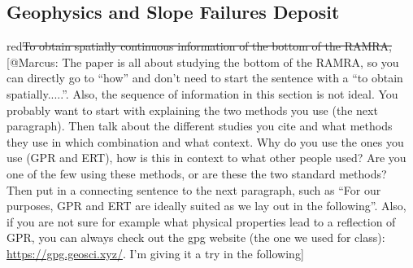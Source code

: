 \documentclass[utf8]{frontiersSCNS}
\newcommand{\alon}{\begin{color}{red}}
\newcommand{\aloff}{\end{color}}
\begin{document}



                 
                 
\subsection{Geophysics and Slope Failures Deposit}

\alon\sout{To obtain spatially continuous information of the bottom of the RAMRA,} [@Marcus: The paper is all about studying the bottom of the RAMRA, so you can directly go to ``how'' and don't need to start the sentence with a ``to obtain spatially.....''. Also, the sequence of information in this section is not ideal. You probably want to start with explaining the two methods you use (the next paragraph). Then talk about the different studies you cite and what methods they use in which combination and what context. Why do you use the ones you use (GPR and ERT), how is this in context to what other people used? Are you one of the few using these methods, or are these the two standard methods? Then put in a connecting sentence to the next paragraph, such as ``For our purposes, GPR and ERT are ideally suited as we lay out in the following''. Also, if you are not sure for example what physical properties lead to a reflection of GPR, you can always check out the gpg website (the one we used for class): \url{https://gpg.geosci.xyz/}. I'm giving it a try in the following] \aloff
\end{document}
